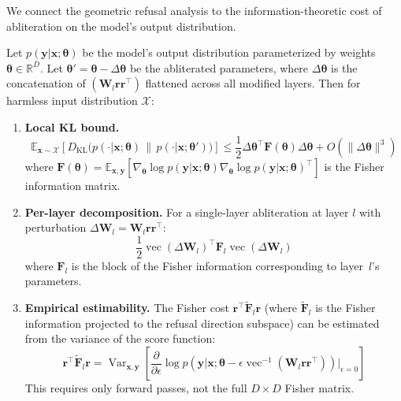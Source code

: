 We connect the geometric refusal analysis to the information-theoretic cost of abliteration on the model's output distribution.

\begin{theorem}
\label{thm:fisher_info}
Let $p(\mathbf{y} | \mathbf{x}; \boldsymbol{\theta})$ be the model's output distribution parameterized by weights $\boldsymbol{\theta} \in \mathbb{R}^D$.
Let $\boldsymbol{\theta}' = \boldsymbol{\theta} - \Delta\boldsymbol{\theta}$ be the abliterated parameters, where $\Delta\boldsymbol{\theta}$ is the concatenation of $(\mathbf{W}_l\mathbf{r}\mathbf{r}^\top)$ flattened across all modified layers.
Then for harmless input distribution $\mathcal{X}$:

\begin{enumerate}[label=(\roman*)]
    \item \textbf{Local KL bound.}
    \begin{equation}
        \mathbb{E}_{\mathbf{x} \sim \mathcal{X}}\!\left[D_{\mathrm{KL}}\!\big(p(\cdot|\mathbf{x};\boldsymbol{\theta}) \,\|\, p(\cdot|\mathbf{x};\boldsymbol{\theta}')\big)\right] \leq \frac{1}{2}\Delta\boldsymbol{\theta}^\top \mathbf{F}(\boldsymbol{\theta}) \Delta\boldsymbol{\theta} + O(\|\Delta\boldsymbol{\theta}\|^3)
    \end{equation}
    where $\mathbf{F}(\boldsymbol{\theta}) = \mathbb{E}_{\mathbf{x},\mathbf{y}}[\nabla_{\boldsymbol{\theta}} \log p(\mathbf{y}|\mathbf{x};\boldsymbol{\theta}) \nabla_{\boldsymbol{\theta}} \log p(\mathbf{y}|\mathbf{x};\boldsymbol{\theta})^\top]$ is the Fisher information matrix.

    \item \textbf{Per-layer decomposition.} For a single-layer abliteration at layer $l$ with perturbation $\Delta\mathbf{W}_l = \mathbf{W}_l\mathbf{r}\mathbf{r}^\top$:
    \begin{equation}
        \frac{1}{2}\operatorname{vec}(\Delta\mathbf{W}_l)^\top \mathbf{F}_l \operatorname{vec}(\Delta\mathbf{W}_l)
    \end{equation}
    where $\mathbf{F}_l$ is the block of the Fisher information corresponding to layer~$l$'s parameters.

    \item \textbf{Empirical estimability.}
    The Fisher cost $\mathbf{r}^\top \tilde{\mathbf{F}}_l \mathbf{r}$ (where $\tilde{\mathbf{F}}_l$ is the Fisher information projected to the refusal direction subspace) can be estimated from the variance of the score function:
    \begin{equation}
        \mathbf{r}^\top \tilde{\mathbf{F}}_l \mathbf{r} = \operatorname{Var}_{\mathbf{x},\mathbf{y}}\!\left[\frac{\partial}{\partial \epsilon}\log p(\mathbf{y}|\mathbf{x};\boldsymbol{\theta} - \epsilon \operatorname{vec}^{-1}(\mathbf{W}_l\mathbf{r}\mathbf{r}^\top))\bigg|_{\epsilon=0}\right]
    \end{equation}
    This requires only forward passes, not the full $D \times D$ Fisher matrix.
\end{enumerate}
\end{theorem}

